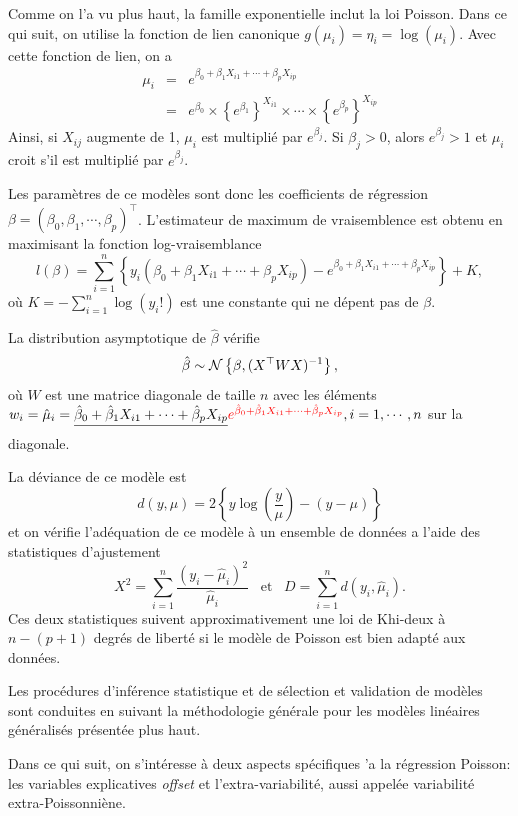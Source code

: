 \documentclass[11pt]{article}
\begin{document}
\noindent Comme on l'a vu plus haut, la famille exponentielle inclut la loi Poisson. Dans ce qui suit, on utilise la fonction de lien canonique $g(\mu_i)=\eta_i=\log(\mu_i)$. Avec cette fonction de lien, on a 
\begin{eqnarray*}
\mu_i &=& e^{\beta_0+\beta_1 X_{i1}+\cdots+\beta_p X_{ip}} \\
&=& e^{\beta_0} \times \left\{e^{\beta_1}\right\}^{X_{i1}} \times \cdots \times \left\{e^{\beta_p}\right\}^{X_{ip}}
\end{eqnarray*}
\noindent Ainsi, si $X_{ij}$ augmente de 1, $\mu_i$ est multipli\'e par $e^{\beta_j}$. Si $\beta_j>0$, alors $e^{\beta_j}>1$ et $\mu_i$ croit s'il est multipli\'e par $e^{\beta_j}$.

\noindent Les param\`etres de ce mod\`eles sont donc les coefficients de r\'egression $\beta=(\beta_0,\beta_1,\cdots,\beta_p)^\top$. L'estimateur de maximum de vraisemblence est obtenu en maximisant la fonction log-vraisemblance
$$l(\beta) = \sum_{i=1}^n \left\{y_i(\beta_0+\beta_1 X_{i1}+\cdots+\beta_p X_{ip})-e^{\beta_0+\beta_1 X_{i1}+\cdots+\beta_p X_{ip}}\right\} + K, $$
\noindent o\`u $K=-\sum_{i=1}^n \log(y_i!)$ est une constante qui ne d\'epent pas de $\beta$.

\noindent La distribution asymptotique de $\hat\beta$ v\'erifie
$$\hat\beta \sim {\cal N}\left\{\beta,(X^\top WX)^{-1}\right\},$$
\noindent o\`u $W$ est une matrice diagonale de taille $n$ avec les \'el\'ements $w_i=\hat\mu_i=\sout{\hat\beta_0+\hat\beta_1 X_{i1}+\cdots+\hat\beta_p X_{ip}}\textcolor{red}{e^{\hat\beta_0+\hat\beta_1 X_{i1}+\cdots+\hat\beta_p X_{ip}}}, i=1,\cdots,n$ sur la diagonale.

\noindent La d\'eviance de ce mod\`ele est 
$$d(y,\mu)=2\left\{y\log(\frac{y}{\mu})-(y-\mu)\right\}$$
et on v\'erifie l'ad\'equation de ce mod\`ele \`a un ensemble de donn\'ees a l'aide des statistiques d'ajustement
$$X^2 = \sum_{i=1}^n \frac{(y_i-\hat\mu_i)^2}{\hat\mu_i} \, \, \, \mbox{ et } \, \, \, D = \sum_{i=1}^n d(y_i,\hat\mu_i).$$
\noindent Ces deux statistiques suivent approximativement une loi de Khi-deux \`a $n-(p+1)$ degr\'es de libert\'e si le mod\`ele de Poisson est bien adapt\'e aux donn\'ees. 

\noindent Les proc\'edures d'inf\'erence statistique et de s\'election et validation de mod\`eles sont conduites en suivant la m\'ethodologie g\'en\'erale pour les mod\`eles lin\'eaires g\'en\'eralis\'es pr\'esent\'ee plus haut.

\noindent Dans ce qui suit, on s'int\'eresse \`a deux aspects sp\'ecifiques 'a la r\'egression Poisson: les variables explicatives {\it offset} et l'extra-variabilit\'e, aussi appel\'ee variabilit\'e extra-Poissonni\`ene. 
\end{document}
